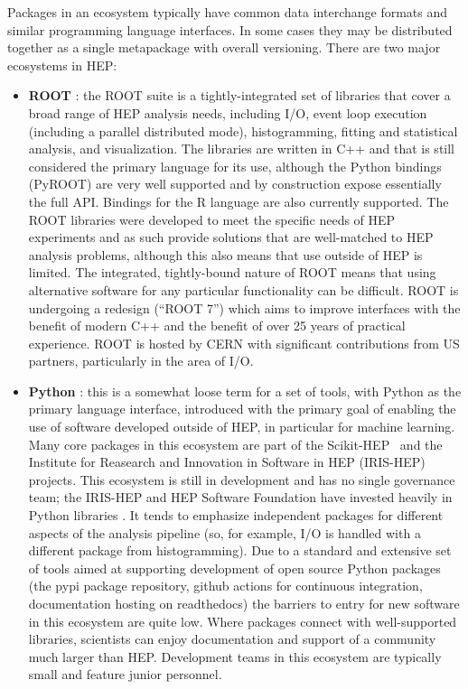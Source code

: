 Packages in an ecosystem typically have common data interchange formats and similar programming language interfaces. In some cases they may be distributed together as a single metapackage with overall versioning. There are two major ecosystems in HEP:
\begin{itemize}
    \item \textbf{ROOT} \cite{Brun:1997pa}: the ROOT suite is a tightly-integrated set of libraries that cover a broad range of HEP analysis needs, including I/O, event loop execution (including a parallel distributed mode), histogramming, fitting and statistical analysis, and visualization. The libraries are written in C++ and that is still considered the primary language for its use, although the Python bindings (PyROOT) are very well supported and by construction expose essentially the full API.  Bindings for the R language are also currently supported. The ROOT libraries were developed to meet the specific needs of HEP experiments and as such provide solutions that are well-matched to HEP analysis problems, although this also means that use outside of HEP is limited. The integrated, tightly-bound nature of ROOT means that using alternative software for any particular functionality can be difficult. ROOT is undergoing a redesign \cite{Naumann:2022pub} (``ROOT 7'') which aims to improve interfaces with the benefit of modern C++ and the benefit of over 25 years of practical experience. ROOT is hosted by CERN with significant contributions from US partners, particularly in the area of I/O.
    \item \textbf{Python} \cite{van1995python,10.5555/1593511}: this is a somewhat loose term for a set of tools, with Python as the primary language interface, introduced with the primary goal of enabling the use of software developed outside of HEP, in particular for machine learning. Many core packages in this ecosystem are part of the Scikit-HEP~\cite{Rodrigues:2020syo} and the Institute for Reasearch and Innovation in Software in HEP (IRIS-HEP)~\cite{IRISHEPWEB} projects. This ecosystem is still in development and has no single governance team; the IRIS-HEP and HEP Software Foundation have invested heavily in Python libraries \cite{Pivarski:2022ycs}. It tends to emphasize independent packages for different aspects of the analysis pipeline (so, for example, I/O is handled with a different package from histogramming). Due to a standard and extensive set of tools aimed at supporting development of open source Python packages (the pypi package repository, github actions for continuous integration, documentation hosting on readthedocs) the barriers to entry for new software in this ecosystem are quite low. Where packages connect with well-supported libraries, scientists can enjoy documentation and support of a community much larger than HEP.  Development teams in this ecosystem are typically small and feature junior personnel.
\end{itemize}

